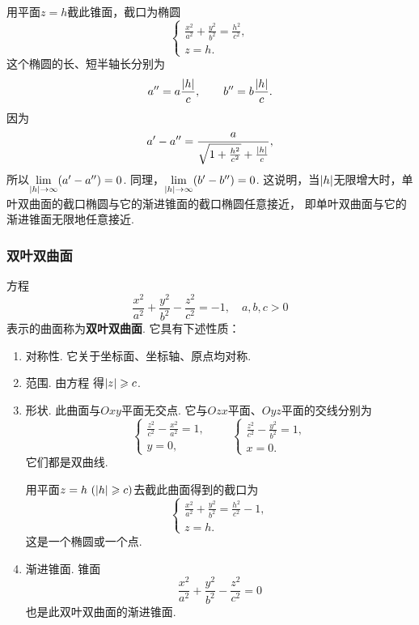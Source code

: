 \begin{enumerate}
	用平面\(z=h\)截此锥面，截口为椭圆\[
		\left\{ \begin{array}{l}
			\frac{x^2}{a^2}+\frac{y^2}{b^2}=\frac{h^2}{c^2}, \\
			z = h.
		\end{array} \right.
	\]
	这个椭圆的长、短半轴长分别为\[
		a'' = a \frac{\abs{h}}{c}, \qquad
		b'' = b \frac{\abs{h}}{c}.
	\]
	因为\[
		a' - a'' = \frac{a}{\sqrt{1+\frac{h^2}{c^2}}+\frac{\abs{h}}{c}},
	\]
	所以\(\lim\limits_{\abs{h}\to\infty}(a'-a'')=0\).
	同理，\(\lim\limits_{\abs{h}\to\infty}(b'-b'')=0\).
	这说明，当\(\abs{h}\)无限增大时，单叶双曲面的截口椭圆与它的渐进锥面的截口椭圆任意接近，
	即单叶双曲面与它的渐进锥面无限地任意接近.
\end{enumerate}

\subsubsection{双叶双曲面}
方程\begin{equation}\label{equation:解析几何.双叶双曲面}
	\frac{x^2}{a^2}+\frac{y^2}{b^2}-\frac{z^2}{c^2}=-1,
	\quad a,b,c>0
\end{equation}
表示的曲面称为\textbf{双叶双曲面}.
它具有下述性质：
\begin{enumerate}
	\item 对称性.
	它关于坐标面、坐标轴、原点均对称.

	\item 范围.
	由方程  得\(\abs{z} \geqslant c\).

	\item 形状.
	此曲面与\(Oxy\)平面无交点.
	它与\(Ozx\)平面、\(Oyz\)平面的交线分别为\[
		\left\{ \begin{array}{l}
			\frac{z^2}{c^2}-\frac{x^2}{a^2}=1, \\
			y = 0,
		\end{array} \right.
		\qquad
		\left\{ \begin{array}{l}
			\frac{z^2}{c^2}-\frac{y^2}{b^2}=1, \\
			x = 0.
		\end{array} \right.
	\]
	它们都是双曲线.

	用平面\(z=h\ (\abs{h}\geqslant c)\)去截此曲面得到的截口为\[
		\left\{ \begin{array}{l}
			\frac{x^2}{a^2}+\frac{y^2}{b^2}=\frac{h^2}{c^2}-1, \\
			z = h.
		\end{array} \right.
	\]
	这是一个椭圆或一个点.

	\item 渐进锥面.
	锥面\[
		\frac{x^2}{a^2}+\frac{y^2}{b^2}-\frac{z^2}{c^2}=0
	\]也是此双叶双曲面的渐进锥面.
\end{enumerate}


